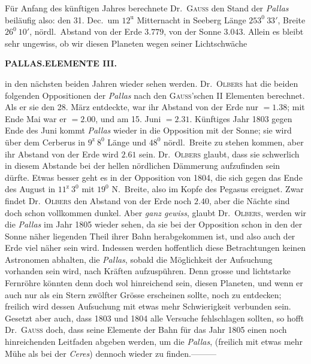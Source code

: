 Für Anfang des künftigen Jahres berechnete Dr.\ \textsc{Gauss} den Stand der \textit{Pallas} beiläufig also: den 31. Dec.\ um $12^{\mathrm{u}}$ Mitternacht in Seeberg Länge $253^0\ 33'$, Breite $26^0\ 10'$, nördl.\ Abstand von der Erde $3.779$, von der Sonne $3.043$. Allein es bleibt sehr ungewiss, ob wir diesen Planeten wegen seiner Lichtschwäche\par
{}
\clearpage
\thispagestyle{empty}
\noindent{}%
%
\parbox[t]{\dimexpr\linewidth-24mm\relax}{\centering\footnotesize\bfseries PALLAS.\enspace ELEMENTE III.\par}%
\makebox[12mm][r]{}\par\nobreak\medskip
\noindent in den nächsten beiden Jahren wieder sehen werden. Dr.\ \textsc{Olbers} hat die beiden folgenden Oppositionen der \textit{Pallas} nach den \textsc{Gauss}'schen II Elementen berechnet. Als er sie den 28. März entdeckte, war ihr Abstand von der Erde nur $=1.38$; mit Ende Mai war er $=2.00$, und am 15. Juni $=2.31$. Künftiges Jahr 1803 gegen Ende des Juni kommt \textit{Pallas} wieder in die Opposition mit der Sonne; sie wird über dem Cerberus in $9^{\mathrm{z}}\ 8^0$ Länge und $48^0$ nördl.\ Breite zu stehen kommen, aber ihr Abstand von der Erde wird $2.61$ sein. Dr.\ \textsc{Olbers} glaubt, dass sie schwerlich in diesem Abstande bei der hellen nördlichen Dämmerung aufzufinden sein dürfte. Etwas besser geht es in der Opposition von 1804, die sich gegen das Ende des August in $11^{\mathrm{z}}\ 3^0$ mit $19^0$ N.\ Breite, also im Kopfe des Pegasus ereignet. Zwar findet Dr.\ \textsc{Olbers} den Abstand von der Erde noch $2.40$, aber die Nächte sind doch schon vollkommen dunkel. Aber \textit{ganz gewiss}, glaubt Dr.\ \textsc{Olbers}, werden wir die \textit{Pallas} im Jahr 1805 wieder sehen, da sie bei der Opposition schon in den der Sonne näher liegenden Theil ihrer Bahn herabgekommen ist, und also auch der Erde viel näher sein wird. Indessen werden hoffentlich diese Betrachtungen keinen Astronomen abhalten, die \textit{Pallas}, sobald die Möglichkeit der Aufsuchung vorhanden sein wird, nach Kräften aufzuspühren. Denn grosse und lichtstarke Fernröhre könnten denn doch wol hinreichend sein, diesen Planeten, und wenn er auch nur als ein Stern zwölfter Grösse erscheinen sollte, noch zu entdecken; freilich wird dessen Aufsuchung mit etwas mehr Schwierigkeit verbunden sein. Gesetzt aber auch, dass 1803 und 1804 alle Versuche fehlschlagen sollten, so hofft Dr.\ \textsc{Gauss} doch, dass seine Elemente der Bahn für das Jahr 1805 einen noch hinreichenden Leitfaden abgeben werden, um die \textit{Pallas}, (freilich mit etwas mehr Mühe als bei der \textit{Ceres}) dennoch wieder zu finden.\quad —\quad —\quad —

